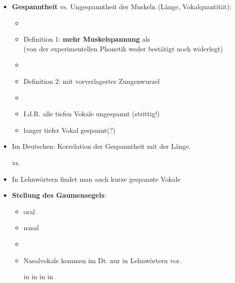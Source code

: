 \begin{frame}

	\begin{itemize}
		\item \textbf{Gespanntheit} vs. Ungespanntheit der Muskeln (Länge, Vokalquantität):
		
		\begin{itemize}
			\item[]
			\item Definition 1: \textipa{[ i:, y:, u:, o: ]} \textbf{mehr Muskelspannung} als \textipa{[ I, Y, U , O ]}\\
			(von der experimentellen Phonetik weder bestätigt noch widerlegt)
			\item[]
			\item Definition 2: mit vorverlagerter Zungenwurzel
			\item[]
			\item I.\;d.\;R. alle tiefen Vokale \ras ungespannt (strittig!)
			\item langer tiefer Vokal \textipa{[ a: ]} \ras gespannt(?)
		\end{itemize}
		
	\end{itemize}
	
\end{frame}



\begin{frame}

	\begin{itemize}
	
		\item Im Deutschen: Korrelation der Gespanntheit mit der Länge.

		\ea \textipa{[ m i: t @ ]} vs. \textipa{[ m I t @ ]}
		\z

		\item In Lehnwörtern findet man auch kurze gespannte Vokale

		\ea \textipa{[ P i . d e: ]}
		\z
		
		
		\item \textbf{Stellung des Gaumensegels}:
		
		\begin{itemize}
			\item oral
			\item nasal
			\item[]
			\item Nasalvokale kommen im Dt. nur in Lehnwörtern vor.

			\eal
			\ex \textipa{[ \~a ]} in 
			\ex \textipa{[ \~o ]} in 
			\ex \textipa{[ \~E ]} in 
			\ex \textipa{[ \~\oe\ ]} in 
			\zl
		
		\end{itemize}
		
	\end{itemize}
	
\end{frame}


